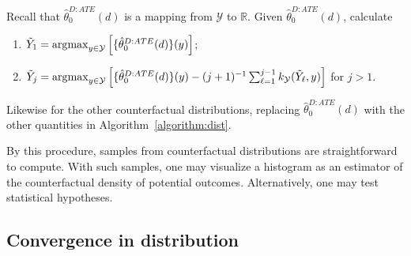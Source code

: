 \begin{algorithm}\label{algorithm:herding}
Recall that $\hat{\theta}_0^{D:ATE}(d)$ is a mapping from $\mathcal{Y}$ to $\mathbb{R}$. 
Given $\hat{\theta}_0^{D:ATE}(d)$, calculate
\begin{enumerate}
    \item $\tilde{Y}_1=\operatorname*{\arg\!\max}_{y\in\mathcal{Y}} \left[ \{\hat{\theta}_0^{D:ATE}(d)\}(y)\right]$;
    \item $\tilde{Y}_{j}=\operatorname*{\arg\!\max}_{y\in\mathcal{Y}} \left[ \{\hat{\theta}_0^{D:ATE}(d)\}(y)-(j+1)^{-1}\sum_{\ell=1}^{j-1}k_{\mathcal{Y}}(\tilde{Y}_{\ell},y)\right]$ for $j>1$.
\end{enumerate}
Likewise for the other counterfactual distributions, replacing $\hat{\theta}_0^{D:ATE}(d)$ with the other quantities in Algorithm~\ref{algorithm:dist}.
\end{algorithm}
By this procedure, samples from counterfactual distributions are straightforward to compute. With such samples, one may visualize a histogram as an estimator of the counterfactual density of potential outcomes. Alternatively, one may test statistical hypotheses.

\subsection{Convergence in distribution}


